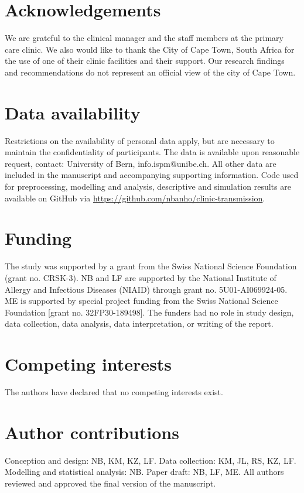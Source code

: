 \documentclass[fleqn,11pt]{wlscirep}
\begin{document}
\newpage


\section*{Acknowledgements}
We are grateful to the clinical manager and the staff members at the primary care clinic. We also would like to thank the City of Cape Town, South Africa for the use of one of their clinic facilities and their support. Our research findings and recommendations do not represent an official view of the city of Cape Town. 

\section*{Data availability}
Restrictions on the availability of personal data apply, but are necessary to maintain the confidentiality of participants. The data is available upon reasonable request, contact: University of Bern, info.ispm@unibe.ch. All other data are included in the manuscript and accompanying supporting information. Code used for preprocessing, modelling and analysis, descriptive and simulation results are available on GitHub via \url{https://github.com/nbanho/clinic-transmission}.

\section*{Funding}
The study was supported by a grant from the Swiss National Science Foundation (grant no. CRSK-3).  NB and LF are supported by the National Institute of Allergy and Infectious Diseases (NIAID) through grant no. 5U01-AI069924-05. ME is supported by special project funding from the Swiss National Science Foundation [grant no. 32FP30-189498]. The funders had no role in study design, data collection, data analysis, data interpretation, or writing of the report.

\section*{Competing interests}
The authors have declared that no competing interests exist.

\section*{Author contributions}
Conception and design: NB, KM, KZ, LF. Data collection: KM, JL, RS, KZ, LF. Modelling and statistical analysis: NB. Paper draft: NB, LF, ME. All authors reviewed and approved the final version of the manuscript.

\newpage


\end{document}
